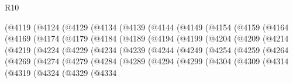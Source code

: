 \begin{lexlean}{R10}
\begin{coremodule}
          (@4119
            (@4124
              (@4129
                (@4134
                  (@4139
                    (@4144
                      (@4149
                        (@4154
                          (@4159
                            (@4164
                              (@4169
                                (@4174
                                  (@4179
                                    (@4184
                                      (@4189
                                        (@4194
                                          (@4199
                                            (@4204
                                              (@4209
                                                (@4214
                                                  (@4219
                                                    (@4224
                                                      (@4229
                                                        (@4234
                                                          (@4239
                                                            (@4244
                                                              (@4249
                                                                (@4254
                                                                  (@4259
                                                                    (@4264
                                                                      (@4269
                                                                        (@4274
                                                                          (@4279
                                                                            (@4284
                                                                              (@4289
                                                                                (@4294
                                                                                  (@4299
                                                                                    (@4304
                                                                                      (@4309
                                                                                        (@4314
                                                                                          (@4319
                                                                                            (@4324
                                                                                              (@4329
                                                                                                (@4334

\end{coremodule}
\end{lexlean}
